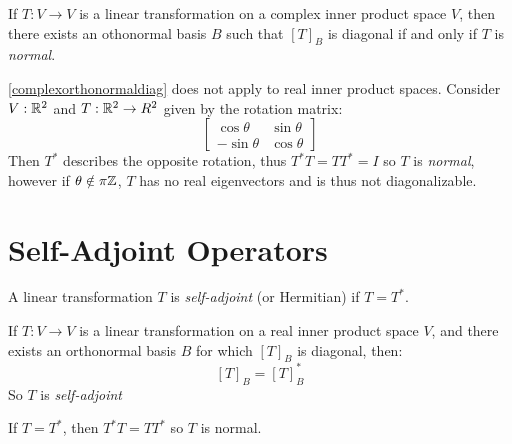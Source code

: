 \begin{corollary}\label{complexorthonormaldiag}
  If $T : V \to V$ is a linear transformation on a complex inner product space $V$,
  then there exists an othonormal basis $B$ such that $[T]_B$ is diagonal if and only if $T$ is \emph{normal}.
\end{corollary}

\begin{remark}
  \ref{complexorthonormaldiag} does not apply to real inner product spaces.
  Consider $V : \mathbb{R}^2$ and $T : \mathbb{R}^2 \to R^2$ given by the rotation matrix:
    $$\begin{bmatrix}
      \cos \theta & \sin \theta \\
      -\sin \theta & \cos \theta
    \end{bmatrix}$$
  Then $T^*$ describes the opposite rotation, thus $T^* T = T T^* = I$ so $T$ is \emph{normal},
  however if $\theta \notin \pi \mathbb{Z}$, $T$ has no real eigenvectors and is thus not diagonalizable.
\end{remark}

\section{Self-Adjoint Operators}

\begin{definition}
  A linear transformation $T$ is \emph{self-adjoint} (or Hermitian) if $T = T^*$.
\end{definition}

\begin{remark}
  If $T : V \to V$ is a linear transformation on a real inner product space $V$,
  and there exists an orthonormal basis $B$ for which $[T]_B$ is diagonal, then:
  $$[T]_B = [T]^*_B$$
  So $T$ is \emph{self-adjoint}
\end{remark}

\begin{remark}
  If $T = T^*$, then $T^* T = T T^*$ so $T$ is normal.
\end{remark}

